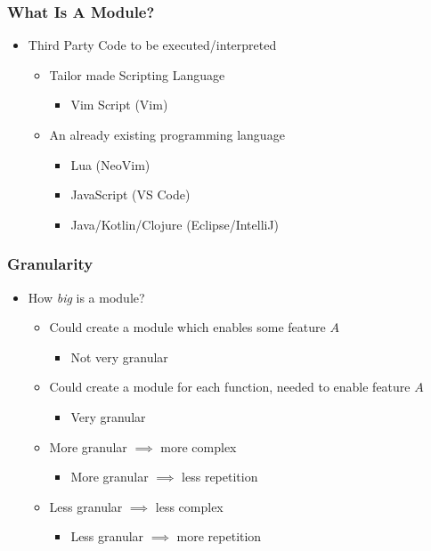 \begin{frame}
  \frametitle{What Is A Module?}
  \begin{itemize}
    \item Third Party Code to be executed/interpreted
      \pause
      \begin{itemize}
        \item Tailor made Scripting Language
          \pause
          \begin{itemize}
            \item Vim Script (Vim)
              \pause
          \end{itemize}
        \item An already existing programming language
        \pause
          \begin{itemize}
            \item Lua (NeoVim)
            \pause
            \item JavaScript (VS Code)
            \pause
            \item Java/Kotlin/Clojure (Eclipse/IntelliJ)
          \end{itemize}
      \end{itemize}
  \end{itemize}
\end{frame}

\begin{frame}
  \frametitle{Granularity}
  \begin{itemize}
    \item How \textit{big} is a module?
      \pause
      \begin{itemize}
        \item Could create a module which enables some feature $A$
          \pause
          \begin{itemize}
            \item Not very granular
          \end{itemize}
          \pause
        \item Could create a module for each function, needed to enable feature
            $A$
          \begin{itemize}
              \pause
            \item Very granular
          \end{itemize}
        \item More granular $\implies$ more complex
        \pause
          \begin{itemize}
            \item More granular $\implies$ less repetition
           \pause
          \end{itemize}
        \item Less granular $\implies$ less complex
        \pause
          \begin{itemize}
            \item Less granular $\implies$ more repetition
            \pause
          \end{itemize}
      \end{itemize}
  \end{itemize}
\end{frame}

